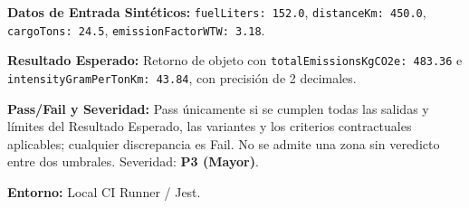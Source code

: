 \par\noindent\textbf{Datos de Entrada Sintéticos:} \texttt{f\allowbreak{}u\allowbreak{}e\allowbreak{}l\allowbreak{}L\allowbreak{}i\allowbreak{}t\allowbreak{}e\allowbreak{}r\allowbreak{}s\allowbreak{}:\allowbreak{} 1\allowbreak{}5\allowbreak{}2\allowbreak{}.\allowbreak{}0\allowbreak{}}, \texttt{d\allowbreak{}i\allowbreak{}s\allowbreak{}t\allowbreak{}a\allowbreak{}n\allowbreak{}c\allowbreak{}e\allowbreak{}K\allowbreak{}m\allowbreak{}:\allowbreak{} 4\allowbreak{}5\allowbreak{}0\allowbreak{}.\allowbreak{}0\allowbreak{}}, \texttt{c\allowbreak{}a\allowbreak{}r\allowbreak{}g\allowbreak{}o\allowbreak{}T\allowbreak{}o\allowbreak{}n\allowbreak{}s\allowbreak{}:\allowbreak{} 2\allowbreak{}4\allowbreak{}.\allowbreak{}5\allowbreak{}}, \texttt{e\allowbreak{}m\allowbreak{}i\allowbreak{}s\allowbreak{}s\allowbreak{}i\allowbreak{}o\allowbreak{}n\allowbreak{}F\allowbreak{}a\allowbreak{}c\allowbreak{}t\allowbreak{}o\allowbreak{}r\allowbreak{}W\allowbreak{}T\allowbreak{}W\allowbreak{}:\allowbreak{} 3\allowbreak{}.\allowbreak{}1\allowbreak{}8\allowbreak{}}.\par
\par\noindent\textbf{Resultado Esperado:} Retorno de objeto con \texttt{t\allowbreak{}o\allowbreak{}t\allowbreak{}a\allowbreak{}l\allowbreak{}E\allowbreak{}m\allowbreak{}i\allowbreak{}s\allowbreak{}s\allowbreak{}i\allowbreak{}o\allowbreak{}n\allowbreak{}s\allowbreak{}K\allowbreak{}g\allowbreak{}C\allowbreak{}O\allowbreak{}2\allowbreak{}e\allowbreak{}:\allowbreak{} 4\allowbreak{}8\allowbreak{}3\allowbreak{}.\allowbreak{}3\allowbreak{}6\allowbreak{}} e \texttt{i\allowbreak{}n\allowbreak{}t\allowbreak{}e\allowbreak{}n\allowbreak{}s\allowbreak{}i\allowbreak{}t\allowbreak{}y\allowbreak{}G\allowbreak{}r\allowbreak{}a\allowbreak{}m\allowbreak{}P\allowbreak{}e\allowbreak{}r\allowbreak{}T\allowbreak{}o\allowbreak{}n\allowbreak{}K\allowbreak{}m\allowbreak{}:\allowbreak{} 4\allowbreak{}3\allowbreak{}.\allowbreak{}8\allowbreak{}4\allowbreak{}}, con precisión de 2 decimales.\par
\par\noindent\textbf{Pass/Fail y Severidad:} Pass únicamente si se cumplen todas las salidas y límites del Resultado Esperado, las variantes y los criterios contractuales aplicables; cualquier discrepancia es Fail. No se admite una zona sin veredicto entre dos umbrales. Severidad: \textbf{P3 (Mayor)}.\par
\par\noindent\textbf{Entorno:} Local CI Runner / Jest.\par







